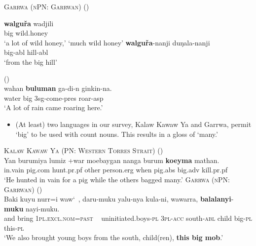 \documentclass{article}
\begin{document}
\begin{exe}
  \ex \textsc{Garrwa (nPN: Garrwan)} (\citealt{furby77})
  \begin{xlist}
    \ex \gll \textbf{walgu\v{r}a} wadjili \\
    big wild.honey\\
    \glt `a lot of wild honey,' `much wild honey' %
    \ex \gll \textbf{walgu\v{r}a}-nanji duŋala-nanji\\
    big-{\sc abl} hill-{\sc abl}\\
    \glt `from the big hill' %
  \end{xlist}
   (\citealt[67]{wilson06})\\
  \gll wahan \textbf{buluman} ga-di-n   ginkin-na.\\
  water   big  3{\sc sg}-come-{\sc pres} roar-{\sc asp}\\
  \glt `A lot of rain came roaring here.'
\end{exe}

\begin{itemize}
\item (At least) two languages in our survey, Kalaw Kawaw Ya and Garrwa, permit `big'  to be used with count nouns. This results in a gloss of `many.' %
\end{itemize}

\begin{exe}
  \ex \textsc{Kalaw Kawaw Ya (PN: Western Torres Strait)} (\citealt[141]{fo91})\\
  \gll Yan burumiya lumiz +war moebaygan nanga burum        \textbf{koeyma}    mathan.\\
  in.vain pig.{\sc com} hunt.{\sc pr.pf} other person.{\sc erg} when   pig.{\sc abs}    big.{\sc adv}    kill.{\sc pr.pf}\\
  \glt `He hunted in vain for a pig while the others bagged many.'
  \ex \textsc{Garrwa (nPN: Garrwan)} (\citealt[80]{mushin12})\\
  \gll Baki kuyu nurr=i waw\char`~, daru-muku yalu-nya kula-ni, wawarra, \textbf{balalanyi}-\textbf{muku} nayi-muku.\\
  and bring 1\textsc{pl.excl.nom}=\textsc{past} {\ } uninitiated.boys-\textsc{pl} 3\textsc{pl}-\textsc{acc} south-\textsc{abl} child big-\textsc{pl} this-\textsc{pl}\\
  \glt `We also brought young boys from the south, child(ren), \textbf{this big mob}.' %
\end{exe}
\end{document}
